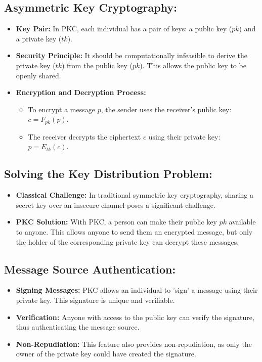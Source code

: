 \documentclass[12pt]{article}
\begin{document}
\subsection*{Asymmetric Key Cryptography:}
\begin{itemize}
    \item \textbf{Key Pair:} In PKC, each individual has a pair of keys: a public key (\( pk \)) and a private key (\( tk \)).
    \item \textbf{Security Principle:} It should be computationally infeasible to derive the private key (\( tk \)) from the public key (\( pk \)). This allows the public key to be openly shared.
    \item \textbf{Encryption and Decryption Process:}
    \begin{itemize}
        \item To encrypt a message \( p \), the sender uses the receiver's public key: \( c = F_{pk}(p) \).
        \item The receiver decrypts the ciphertext \( c \) using their private key: \( p = E_{tk}(c) \).
    \end{itemize}
\end{itemize}

\subsection*{Solving the Key Distribution Problem:}
\begin{itemize}
    \item \textbf{Classical Challenge:} In traditional symmetric key cryptography, sharing a secret key over an insecure channel poses a significant challenge.
    \item \textbf{PKC Solution:} With PKC, a person can make their public key \( pk \) available to anyone. This allows anyone to send them an encrypted message, but only the holder of the corresponding private key can decrypt these messages.
\end{itemize}

\subsection*{Message Source Authentication:}
\begin{itemize}
    \item \textbf{Signing Messages:} PKC allows an individual to 'sign' a message using their private key. This signature is unique and verifiable.
    \item \textbf{Verification:} Anyone with access to the public key can verify the signature, thus authenticating the message source.
    \item \textbf{Non-Repudiation:} This feature also provides non-repudiation, as only the owner of the private key could have created the signature.
\end{itemize}
\end{document}

